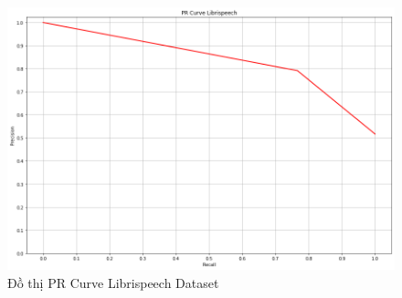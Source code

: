 \documentclass{article}
\begin{document}
	\begin{figure}[H]
		\centering
		\includegraphics[width=.75\textwidth]{result/pr_curve_librispeech.png}
		\caption{Đồ thị PR Curve Librispeech Dataset}
		\label{fig:writing-thesis}
	\end{figure}
\end{document}
